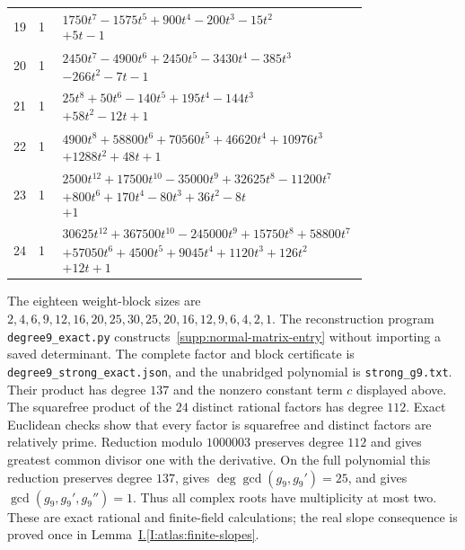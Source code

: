 \documentclass[11pt]{amsart}
\theoremstyle{definition}
\theoremstyle{remark}
\numberwithin{equation}{section}
\newcommand{\partIref}[1]{\hyperref[I:#1]{I.\ref*{I:#1}}}
\begin{document}
{{\begin{longtable}{r r p{}}
19&1& $\begin{gathered}1750 t^{7} - 1575 t^{5} + 900 t^{4} - 200 t^{3} - 15 t^{2}\\+5 t - 1\end{gathered}$ \\
20&1& $\begin{gathered}2450 t^{7} - 4900 t^{6} + 2450 t^{5} - 3430 t^{4} - 385 t^{3}\\- 266 t^{2} - 7 t - 1\end{gathered}$ \\
21&1& $\begin{gathered}25 t^{8} + 50 t^{6} - 140 t^{5} + 195 t^{4} - 144 t^{3}\\+58 t^{2} - 12 t + 1\end{gathered}$ \\
22&1& $\begin{gathered}4900 t^{8} + 58800 t^{6} + 70560 t^{5} + 46620 t^{4} + 10976 t^{3}\\+1288 t^{2} + 48 t + 1\end{gathered}$ \\
23&1& $\begin{gathered}2500 t^{12} + 17500 t^{10} - 35000 t^{9} + 32625 t^{8} - 11200 t^{7}\\+800 t^{6} + 170 t^{4} - 80 t^{3} + 36 t^{2} - 8 t\\+1\end{gathered}$ \\
24&1& $\begin{gathered}30625 t^{12} + 367500 t^{10} - 245000 t^{9} + 15750 t^{8} + 58800 t^{7}\\+57050 t^{6} + 4500 t^{5} + 9045 t^{4} + 1120 t^{3} + 126 t^{2}\\+12 t + 1\end{gathered}$ \\
\bottomrule\end{longtable}}
The eighteen weight-block sizes are $2,4,6,9,12,16,20,25,30,25,20,16,12,9,6,4,2,1$. The reconstruction program \texttt{degree9\_exact.py} constructs~\eqref{supp:normal-matrix-entry} without importing a saved determinant. The complete factor and block certificate is \texttt{degree9\_strong\_exact.json}, and the unabridged polynomial is \texttt{strong\_g9.txt}. Their product has degree $137$ and the nonzero constant term $c$ displayed above. The squarefree product of the $24$ distinct rational factors has degree $112$. Exact Euclidean checks show that every factor is squarefree and distinct factors are relatively prime. Reduction modulo $1000003$ preserves degree $112$ and gives greatest common divisor one with the derivative. On the full polynomial this reduction preserves degree $137$, gives $\deg\gcd(g_9,g_9')=25$, and gives $\gcd(g_9,g_9',g_9'')=1$. Thus all complex roots have multiplicity at most two. These are exact rational and finite-field calculations; the real slope consequence is proved once in Lemma~\partIref{atlas:finite-slopes}.

}
\end{document}
